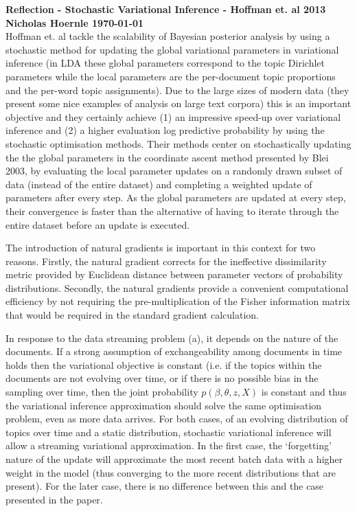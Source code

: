 \documentclass[twoside]{article}
\begin{document}
\textbf{Reflection - Stochastic Variational Inference - Hoffman et. al 2013}\\
\textbf{Nicholas Hoernle \hfill \today}\\

Hoffman et. al tackle the scalability of Bayesian posterior analysis by using a stochastic method for updating the global variational parameters in variational inference (in LDA these global parameters correspond to the topic Dirichlet parameters while the local parameters are the per-document topic proportions and the per-word topic assignments). Due to the large sizes of modern data (they present some nice examples of analysis on large text corpora) this is an important objective and they certainly achieve (1) an impressive speed-up over variational inference and (2) a higher evaluation log predictive probability by using the stochastic optimisation methods. Their methods center on stochastically updating the the global parameters in the coordinate ascent method presented by Blei 2003, by evaluating the local parameter updates on a randomly drawn subset of data (instead of the entire dataset) and completing a weighted update of parameters after every step. As the global parameters are updated at every step, their convergence is faster than the alternative of having to iterate through the entire dataset before an update is executed.

The introduction of natural gradients is important in this context for two reasons. Firstly, the natural gradient corrects for the ineffective dissimilarity metric provided by Euclidean distance between parameter vectors of probability distributions. Secondly, the natural gradients provide a convenient computational efficiency by not requiring the pre-multiplication of the Fisher information matrix that would be required in the standard gradient calculation.

In response to the data streaming problem (a), it depends on the nature of the documents. If a strong assumption of exchangeability among documents in time holds then the variational objective is constant (i.e. if the topics within the documents are not evolving over time, or if there is no possible bias in the sampling over time, then the joint probability $p(\beta, \theta, z, X)$ is constant and thus the variational inference approximation should solve the same optimisation problem, even as more data arrives. For both cases, of an evolving distribution of topics over time and a static distribution, stochastic variational inference will allow a streaming variational approximation. In the first case, the `forgetting' nature of the update will approximate the most recent batch data with a higher weight in the model (thus converging to the more recent distributions that are present). For the later case, there is no difference between this and the case presented in the paper.
\end{document}

